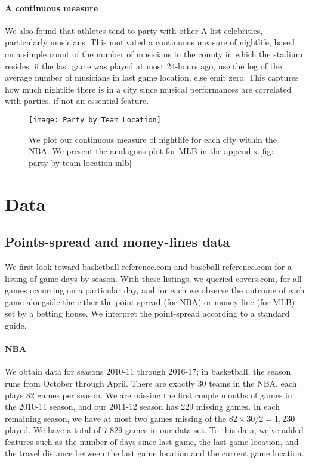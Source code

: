 \documentclass[letterpaper,12pt]{article}
\begin{document}
\paragraph{A continuous measure}
We also found that athletes tend to party with other A-list celebrities,
particularly musicians. This motivated a continuous measure of nightlife, based on a simple count of the number of musicians in the county in which the stadium resides: if the last game was played at most 24-hours ago, use the log of the average number
of musicians in last game location, else emit zero.  
This captures
how much nightlife there is in a city since musical performances are correlated
with parties, if not an essential feature.

\begin{figure}
  \centering
  \label{fig: party by team loc}
  \texttt{[image: Party\_by\_Team\_Location]}
  \caption{We plot our continuous measure of nightlife for each city within the NBA. We present the analagous plot for MLB in the appendix.\ref{fig: party by team location mlb}}
\end{figure}

\section{Data}
\subsection{Points-spread and money-lines data} We first look toward 
\href{http://www.basketball-reference.com/leagues/}{basketball-reference.com} and
\href{http://www.baseball-reference.com/leagues/}{baseball-reference.com}
for a listing of game-days by season. With these listings, we queried \href{http://www.covers.com/sports/NBA/matchups?selectedDate=2011-1-01}{covers.com},
for all games occurring on a particular day, and for each we observe the
outcome of each game alongside the either the point-spread (for NBA) or money-line (for MLB) 
set by a betting house. 
We interpret the point-spread according to a standard guide.\citep{hrisports} 

\paragraph{NBA}
We obtain
data for seasons 2010-11 through 2016-17; in basketball, the season runs from October through April. 
There are exactly 30 teams in the NBA,
each plays 82 games per season.
We are missing the first couple months of games 
in the 2010-11 season, and our 2011-12 season has 229 missing games. In each remaining
season, we have at most two games missing of the $82 \times 30 / 2 = 1,230$ played.
We have a total of 7,829 games in our data-set.
To this data, we've added features such as 
the number of days since last game, the last game location, and the travel 
distance between the last game location and the current game location.
\end{document}
